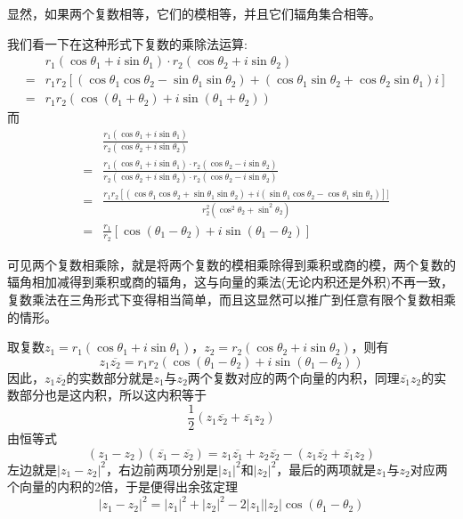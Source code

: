 显然，如果两个复数相等，它们的模相等，并且它们辐角集合相等。

我们看一下在这种形式下复数的乘除法运算:
\begin{eqnarray*}
  &&  r_1(\cos{\theta_1}+i\sin{\theta_1}) \cdot r_2(\cos{\theta_2}+i\sin{\theta_2}) \\
  & = & r_1r_2[(\cos{\theta_1}\cos{\theta_2}-\sin{\theta_1}\sin{\theta_2})+(\cos{\theta_1}\sin{\theta_2}+\cos{\theta_2}\sin{\theta_1})i] \\
  & = & r_1r_2(\cos{(\theta_1+\theta_2)}+i\sin{(\theta_1+\theta_2)})
\end{eqnarray*}
而
\begin{eqnarray*}
  &&  \frac{r_1(\cos{\theta_1}+i\sin{\theta_1})}{r_2(\cos{\theta_2}+i\sin{\theta_2})} \\
  & = & \frac{r_1(\cos{\theta_1}+i\sin{\theta_1}) \cdot r_2(\cos{\theta_2}-i\sin{\theta_2})}{r_2(\cos{\theta_2}+i\sin{\theta_2}) \cdot r_2(\cos{\theta_2}-i\sin{\theta_2})} \\
  & = & \frac{r_1r_2[(\cos{\theta_1}\cos{\theta_2}+\sin{\theta_1}\sin{\theta_2})+i(\sin{\theta_1}\cos{\theta_2}-\cos{\theta_1}\sin{\theta_2})]]}{r_2^2(\cos^2{\theta_2}+\sin^2{\theta_2})} \\
  & = & \frac{r_1}{r_2}[\cos{(\theta_1-\theta_2)+i\sin{(\theta_1-\theta_2)}}]
\end{eqnarray*}

可见两个复数相乘除，就是将两个复数的模相乘除得到乘积或商的模，两个复数的辐角相加减得到乘积或商的辐角，这与向量的乘法(无论内积还是外积)不再一致，复数乘法在三角形式下变得相当简单，而且这显然可以推广到任意有限个复数相乘的情形。

\begin{example}[利用共轭复数证明余弦定理]
  取复数$z_1=r_1(\cos{\theta_1}+i\sin{\theta_1})$，$z_2=r_2(\cos{\theta_2}+i\sin{\theta_2})$，则有
  \[ z_1\overline{z_2} = r_1r_2(\cos{(\theta_1-\theta_2)+i\sin{(\theta_1-\theta_2)}}) \]
  因此，$z_1\overline{z_2}$的实数部分就是$z_1$与$z_2$两个复数对应的两个向量的内积，同理$\overline{z_1}z_2$的实数部分也是这内积，所以这内积等于
  \[ \frac{1}{2}(z_1\overline{z_2}+\overline{z_1}z_2) \]
  由恒等式
  \[ (z_1-z_2)(\overline{z_1}-\overline{z_2})= z_1\overline{z_1} + z_2\overline{z_2} -(z_1\overline{z_2}+\overline{z_1}z_2) \]
  左边就是$|z_1-z_2|^2$，右边前两项分别是$|z_1|^2$和$|z_2|^2$，最后的两项就是$z_1$与$z_2$对应两个向量的内积的2倍，于是便得出余弦定理
  \[ |z_1-z_2|^2 = |z_1|^2+|z_2|^2-2|z_1||z_2|\cos{(\theta_1-\theta_2)} \]
\end{example}

